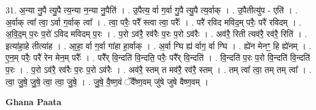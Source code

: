 \documentclass[17pt]{extarticle}
\begin{document}
31. अ॒न्या नु॒पै त्यु॒पै त्य॒न्या न॒न्या नु॒पैति॑ । . उ॒पैत्य॒ र्वा ग॒र्वा गु॒पै त्यु॒पै त्य॒र्वाक् । . उ॒पैतीत्यु॑प - एति॑ । . अ॒र्वाक् त्वा᳚ त्वा॒ ऽर्वा ग॒र्वाक् त्वा᳚ । . त्वा॒ परैः॒ परै᳚ स्त्वा त्वा॒ परैः᳚ । . परै॑ रविद मविद॒म् परैः॒ परै॑ रविदम् । . अ॒वि॒द॒म् प॒रः प॒रो॑ ऽविद मविदम् प॒रः । . प॒रो ऽव॑रै॒ रव॑रैः प॒रः प॒रो ऽव॑रैः । . अव॑रै॒ रिती त्यव॑रै॒ रव॑रै॒ रिति॑ । . इत्या॑हा॒हे तीत्या॑ह । . आ॒हा॒ र्वा ग॒र्वा गा॑हा हा॒र्वाक् । . अ॒र्वा ग्घि ह्य॑ र्वाग॒ र्वा ग्घि । . ह्ये॑न मेनꣳ॒॒ हि ह्ये॑नम् । . ए॒न॒म् परैः॒ परै॑ रेन मेन॒म् परैः᳚ । . परै᳚र् वि॒न्दति॑ वि॒न्दति॒ परैः॒ परै᳚र् वि॒न्दति॑ । . वि॒न्दति॑ प॒रः प॒रो वि॒न्दति॑ वि॒न्दति॑ प॒रः । . प॒रो ऽव॑रै॒ रव॑रैः प॒रः प॒रो ऽव॑रैः । . अव॑रै॒ स्तम् त मव॑रै॒ रव॑रै॒ स्तम् । . तम् त्वा᳚ त्वा॒ तम् तम् त्वा᳚ । . त्वा॒ जु॒षे॒ जु॒षे॒ त्वा॒ त्वा॒ जु॒षे॒ । . जु॒षे॒ वै॒ष्ण॒वं ॅवै᳚ष्ण॒वम् जु॑षे जुषे वैष्ण॒वम् । \newline

\textbf{Ghana Paata } \newline
\end{document}
